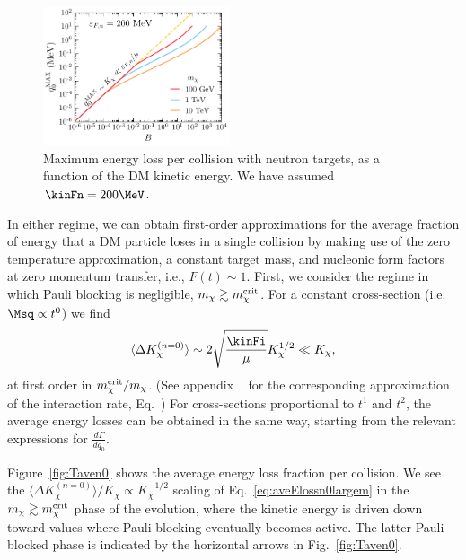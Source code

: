 \begin{figure}
  \centering
  \includegraphics[width=0.49\textwidth]{q0max_Tdm.pdf}
  \caption{Maximum energy loss per collision with neutron targets, as a function of the DM kinetic energy. We have assumed $\kinFn=200\MeV$.} 
  \label{fig:q0max}
\end{figure}



In either regime, we can obtain first-order approximations for the average fraction of energy that a DM particle loses in a single collision by making use of the zero temperature approximation, a constant target mass, and nucleonic form factors at zero momentum transfer, i.e., $F(t)\sim1$. 
First, we consider the regime in which Pauli blocking is negligible, $m_\chi \gtrsim m_\chi^{\rm crit}$. For a constant cross-section (i.e. $\Msq \propto t^0$) we find 
\begin{equation}
  \langle \Delta K_\chi^{(n=0)} \rangle 
  \sim 2 \sqrt{\frac{\kinFi}{\mu}} K_\chi^{1/2} \ll K_\chi, 
\label{eq:aveElossn0largem}
\end{equation}
at first order in $m_\chi^{\rm crit}/m_\chi$. (See appendix 
~ for the corresponding approximation of the interaction rate, Eq.~) 
For cross-sections proportional to $t^1$ and $t^2$, the average energy losses
can be obtained in the same way, starting from the relevant expressions for  $\frac{d\Gamma}{d q_0}$.

Figure~\ref{fig:Taven0} shows the average energy loss fraction per collision. We see the  $\langle \Delta K_\chi^{(n=0)} \rangle/K_\chi \propto K_\chi^{-1/2}$ scaling of Eq.~\ref{eq:aveElossn0largem}
in the $m_\chi \gtrsim m_\chi^{\rm crit}$ phase of the evolution, where the kinetic energy is driven down toward values where Pauli blocking eventually becomes active. The latter Pauli blocked phase is indicated by the horizontal arrows in Fig.~\ref{fig:Taven0}. 





